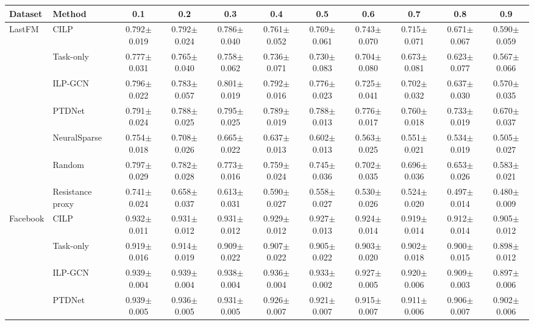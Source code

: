 \begin{center}\scriptsize
\begin{tabular}{@{}llccccccccc@{}}
\toprule
Dataset & Method & 0.1 & 0.2 & 0.3 & 0.4 & 0.5 & 0.6 & 0.7 & 0.8 & 0.9 \\
\midrule
LastFM & CILP & 0.792$\pm$0.019 & 0.792$\pm$0.024 & 0.786$\pm$0.040 & 0.761$\pm$0.052 & 0.769$\pm$0.061 & 0.743$\pm$0.070 & 0.715$\pm$0.071 & 0.671$\pm$0.067 & 0.590$\pm$0.059 \\
 & Task-only & 0.777$\pm$0.031 & 0.765$\pm$0.040 & 0.758$\pm$0.062 & 0.736$\pm$0.071 & 0.730$\pm$0.083 & 0.704$\pm$0.080 & 0.673$\pm$0.081 & 0.623$\pm$0.077 & 0.567$\pm$0.066 \\
 & ILP-GCN & 0.796$\pm$0.022 & 0.783$\pm$0.057 & 0.801$\pm$0.019 & 0.792$\pm$0.016 & 0.776$\pm$0.023 & 0.725$\pm$0.041 & 0.702$\pm$0.032 & 0.637$\pm$0.030 & 0.570$\pm$0.035 \\
 & PTDNet & 0.791$\pm$0.024 & 0.788$\pm$0.025 & 0.795$\pm$0.025 & 0.789$\pm$0.019 & 0.788$\pm$0.013 & 0.776$\pm$0.017 & 0.760$\pm$0.018 & 0.733$\pm$0.019 & 0.670$\pm$0.037 \\
 & NeuralSparse & 0.754$\pm$0.018 & 0.708$\pm$0.026 & 0.665$\pm$0.022 & 0.637$\pm$0.013 & 0.602$\pm$0.013 & 0.563$\pm$0.025 & 0.551$\pm$0.021 & 0.534$\pm$0.019 & 0.505$\pm$0.027 \\
 & Random & 0.797$\pm$0.029 & 0.782$\pm$0.028 & 0.773$\pm$0.016 & 0.759$\pm$0.024 & 0.745$\pm$0.036 & 0.702$\pm$0.035 & 0.696$\pm$0.036 & 0.653$\pm$0.026 & 0.583$\pm$0.021 \\
 & Resistance proxy & 0.741$\pm$0.024 & 0.658$\pm$0.037 & 0.613$\pm$0.031 & 0.590$\pm$0.027 & 0.558$\pm$0.027 & 0.530$\pm$0.026 & 0.524$\pm$0.020 & 0.497$\pm$0.014 & 0.480$\pm$0.009 \\
\midrule
Facebook & CILP & 0.932$\pm$0.011 & 0.931$\pm$0.012 & 0.931$\pm$0.012 & 0.929$\pm$0.012 & 0.927$\pm$0.013 & 0.924$\pm$0.014 & 0.919$\pm$0.014 & 0.912$\pm$0.014 & 0.905$\pm$0.012 \\
 & Task-only & 0.919$\pm$0.016 & 0.914$\pm$0.019 & 0.909$\pm$0.022 & 0.907$\pm$0.022 & 0.905$\pm$0.022 & 0.903$\pm$0.020 & 0.902$\pm$0.018 & 0.900$\pm$0.015 & 0.898$\pm$0.012 \\
 & ILP-GCN & 0.939$\pm$0.004 & 0.939$\pm$0.004 & 0.938$\pm$0.004 & 0.936$\pm$0.004 & 0.933$\pm$0.002 & 0.927$\pm$0.005 & 0.920$\pm$0.006 & 0.909$\pm$0.003 & 0.897$\pm$0.006 \\
 & PTDNet & 0.939$\pm$0.005 & 0.936$\pm$0.005 & 0.931$\pm$0.005 & 0.926$\pm$0.007 & 0.921$\pm$0.007 & 0.915$\pm$0.007 & 0.911$\pm$0.006 & 0.906$\pm$0.007 & 0.902$\pm$0.006 \\

\end{tabular}
\end{center}
